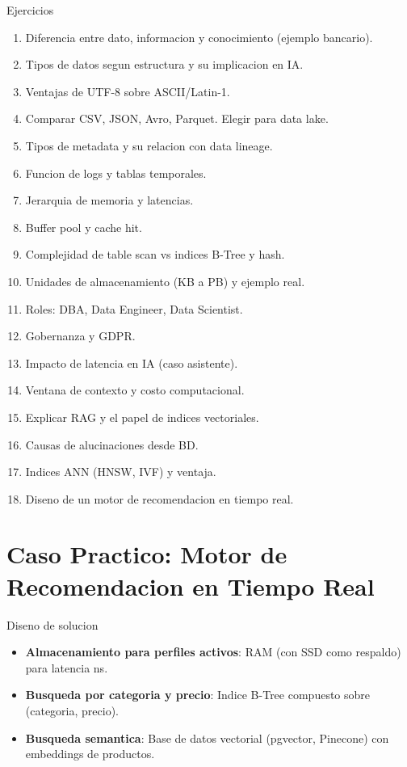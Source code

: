 \documentclass[aspectratio=169, 10pt, xcolor=table]{beamer}
\begin{document}
\begin{frame}{Ejercicios}
    \begin{enumerate}
        \item Diferencia entre dato, informacion y conocimiento (ejemplo bancario).
        \item Tipos de datos segun estructura y su implicacion en IA.
        \item Ventajas de UTF-8 sobre ASCII/Latin-1.
        \item Comparar CSV, JSON, Avro, Parquet. Elegir para data lake.
        \item Tipos de metadata y su relacion con data lineage.
        \item Funcion de logs y tablas temporales.
        \item Jerarquia de memoria y latencias.
        \item Buffer pool y cache hit.
        \item Complejidad de table scan vs indices B-Tree y hash.
        \item Unidades de almacenamiento (KB a PB) y ejemplo real.
        \item Roles: DBA, Data Engineer, Data Scientist.
        \item Gobernanza y GDPR.
        \item Impacto de latencia en IA (caso asistente).
        \item Ventana de contexto y costo computacional.
        \item Explicar RAG y el papel de indices vectoriales.
        \item Causas de alucinaciones desde BD.
        \item Indices ANN (HNSW, IVF) y ventaja.
        \item Diseno de un motor de recomendacion en tiempo real.
    \end{enumerate}
\end{frame}

\section{Caso Practico: Motor de Recomendacion en Tiempo Real}

\begin{frame}{Diseno de solucion}
    \begin{itemize}
        \item \textbf{Almacenamiento para perfiles activos}: RAM (con SSD como respaldo) para latencia ns.
        \item \textbf{Busqueda por categoria y precio}: Indice B-Tree compuesto sobre (categoria, precio).
        \item \textbf{Busqueda semantica}: Base de datos vectorial (pgvector, Pinecone) con embeddings de productos.
    \end{itemize}
\end{frame}
\end{document}
